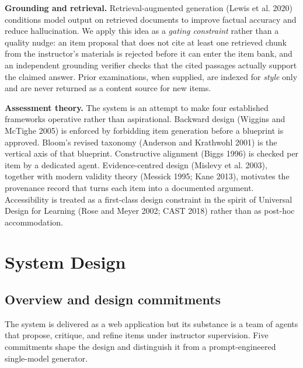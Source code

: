 \documentclass[
  11pt,
  letterpaper,
]{article}
\begin{document}
\textbf{Grounding and retrieval.} Retrieval-augmented generation (Lewis
et al. 2020) conditions model output on retrieved documents to improve
factual accuracy and reduce hallucination. We apply this idea as a
\emph{gating constraint} rather than a quality nudge: an item proposal
that does not cite at least one retrieved chunk from the instructor's
materials is rejected before it can enter the item bank, and an
independent grounding verifier checks that the cited passages actually
support the claimed answer. Prior examinations, when supplied, are
indexed for \emph{style} only and are never returned as a content source
for new items.

\textbf{Assessment theory.} The system is an attempt to make four
established frameworks operative rather than aspirational. Backward
design (Wiggins and McTighe 2005) is enforced by forbidding item
generation before a blueprint is approved. Bloom's revised taxonomy
(Anderson and Krathwohl 2001) is the vertical axis of that blueprint.
Constructive alignment (Biggs 1996) is checked per item by a dedicated
agent. Evidence-centred design (Mislevy et al. 2003), together with
modern validity theory (Messick 1995; Kane 2013), motivates the
provenance record that turns each item into a documented argument.
Accessibility is treated as a first-class design constraint in the
spirit of Universal Design for Learning (Rose and Meyer 2002; CAST 2018)
rather than as post-hoc accommodation.

\section{System Design}\label{system-design}

\subsection{Overview and design
commitments}\label{overview-and-design-commitments}

The system is delivered as a web application but its substance is a team
of agents that propose, critique, and refine items under instructor
supervision. Five commitments shape the design and distinguish it from a
prompt-engineered single-model generator.
\end{document}
